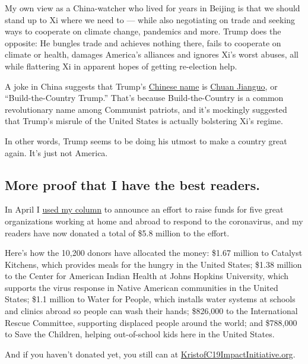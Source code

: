 My own view as a China-watcher who lived for years in Beijing is that we
should stand up to Xi where we need to --- while also negotiating on
trade and seeking ways to cooperate on climate change, pandemics and
more. Trump does the opposite: He bungles trade and achieves nothing
there, fails to cooperate on climate or health, damages America's
alliances and ignores Xi's worst abuses, all while flattering Xi in
apparent hopes of getting re-election help.

A joke in China suggests that Trump's
\href{https://www.whatsonweibo.com/trump-two-different-names-chinese/}{Chinese
name} is
\href{https://www.quora.com/Why-do-so-many-Chinese-people-call-Donald-Trump-Chuan-Jianguo-\%E5\%B7\%9D\%E5\%BB\%BA\%E5\%9B\%BD}{Chuan
Jianguo}, or ``Build-the-Country Trump.'' That's because
Build-the-Country is a common revolutionary name among Communist
patriots, and it's mockingly suggested that Trump's misrule of the
United States is actually bolstering Xi's regime.

In other words, Trump seems to be doing his utmost to make a country
great again. It's just not America.

\hypertarget{more-proof-that-i-have-the-best-readers}{%
\subsection{More proof that I have the best
readers.}\label{more-proof-that-i-have-the-best-readers}}

In April I
\href{https://www.nytimes.com/2020/04/25/opinion/sunday/coronavirus-giving-guide.html}{used
my column} to announce an effort to raise funds for five great
organizations working at home and abroad to respond to the coronavirus,
and my readers have now donated a total of \$5.8 million to the effort.

Here's how the 10,200 donors have allocated the money: \$1.67 million to
Catalyst Kitchens, which provides meals for the hungry in the United
States; \$1.38 million to the Center for American Indian Health at Johns
Hopkins University, which supports the virus response in Native American
communities in the United States; \$1.1 million to Water for People,
which installs water systems at schools and clinics abroad so people can
wash their hands; \$826,000 to the International Rescue Committee,
supporting displaced people around the world; and \$788,000 to Save the
Children, helping out-of-school kids here in the United States.

And if you haven't donated yet, you still can at
\href{https://kristofc19impactinitiative.org/}{KristofC19ImpactInitiative.org}.

